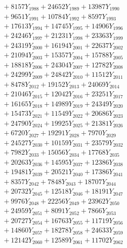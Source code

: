 \documentclass[a4paper,10pt]{article}
\begin{document}
{\begin{align}
&\;  + 8157 Y_{1988} + 24652 Y_{1989} + 13987 Y_{1990} \\[0.3ex]
&\;  + 9651 Y_{1991} + 10784 Y_{1992} + 8597 Y_{1993} \\[0.3ex]
&\;  + 17613 Y_{1994} + 14745 Y_{1995} + 14906 Y_{1996} \\[0.3ex]
&\;  + 24246 Y_{1997} + 21231 Y_{1998} + 23363 Y_{1999} \\[0.3ex]
&\;  + 24319 Y_{2000} + 16194 Y_{2001} + 22637 Y_{2002} \\[0.3ex]
&\;  + 21094 Y_{2003} + 15357 Y_{2004} + 15788 Y_{2005} \\[0.3ex]
&\;  + 18818 Y_{2006} + 24304 Y_{2007} + 12782 Y_{2008} \\[0.5ex]\allowbreak
&\;  + 24299 Y_{2009} + 24842 Y_{2010} + 11512 Y_{2011} \\[0.3ex]
&\;  + 8478 Y_{2012} + 19152 Y_{2013} + 24069 Y_{2014} \\[0.3ex]
&\;  + 21046 Y_{2015} + 12042 Y_{2016} + 23251 Y_{2017} \\[0.3ex]
&\;  + 16165 Y_{2018} + 14989 Y_{2019} + 24349 Y_{2020} \\[0.3ex]
&\;  + 15473 Y_{2021} + 11549 Y_{2022} + 20686 Y_{2023} \\[0.3ex]
&\;  + 24790 Y_{2024} + 19925 Y_{2025} + 21381 Y_{2026} \\[0.3ex]
&\;  + 6720 Y_{2027} + 19291 Y_{2028} + 7970 Y_{2029} \\[0.3ex]
&\;  + 24527 Y_{2030} + 10159 Y_{2031} + 23579 Y_{2032} \\[0.3ex]
&\;  + 7982 Y_{2033} + 15056 Y_{2034} + 17768 Y_{2035} \\[0.3ex]
&\;  + 20263 Y_{2036} + 14595 Y_{2037} + 12386 Y_{2038} \\[0.5ex]\allowbreak
&\;  + 19481 Y_{2039} + 20521 Y_{2040} + 17386 Y_{2041} \\[0.3ex]
&\;  + 8357 Y_{2042} + 7848 Y_{2043} + 18707 Y_{2044} \\[0.3ex]
&\;  + 20732 Y_{2045} + 12518 Y_{2046} + 18191 Y_{2047} \\[0.3ex]
&\;  + 9976 Y_{2048} + 22256 Y_{2049} + 23962 Y_{2050} \\[0.3ex]
&\;  + 24959 Y_{2051} + 8091 Y_{2052} + 7866 Y_{2053} \\[0.3ex]
&\;  + 20727 Y_{2054} + 16763 Y_{2055} + 11719 Y_{2056} \\[0.3ex]
&\;  + 14860 Y_{2057} + 18278 Y_{2058} + 24633 Y_{2059} \\[0.3ex]
&\;  + 12142 Y_{2060} + 12589 Y_{2061} + 11702 Y_{2062} \\[0.3ex]

\end{align}}
\end{document}
